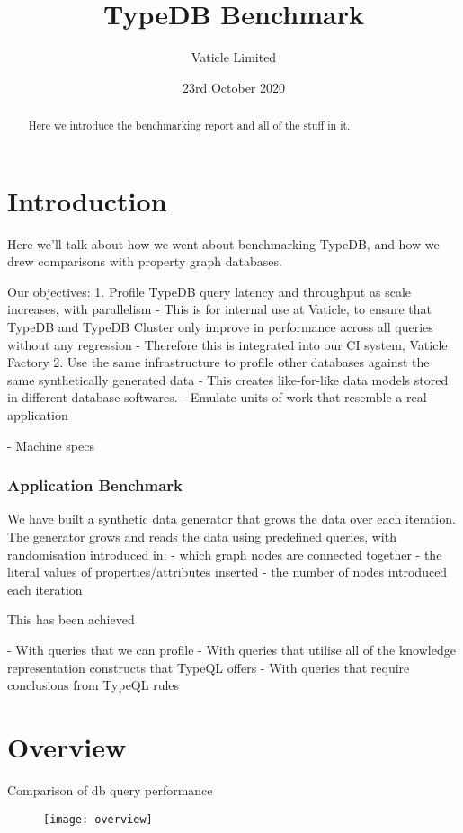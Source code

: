 \documentclass{article}
\begin{document}
\title{TypeDB Benchmark}
\date{23rd October 2020}
\author{Vaticle Limited}

\maketitle

\begin{abstract}
Here we introduce the benchmarking report and all of the stuff in it.
\end{abstract}

\section{Introduction}
Here we'll talk about how we went about benchmarking TypeDB, and how we drew comparisons with property graph databases.

Our objectives:
1. Profile TypeDB query latency and throughput as scale increases, with parallelism
    - This is for internal use at Vaticle, to ensure that TypeDB and TypeDB Cluster only improve in performance across all queries without any regression
    - Therefore this is integrated into our CI system, Vaticle Factory
2. Use the same infrastructure to profile other databases against the same synthetically generated data
    - This creates like-for-like data models stored in different database softwares.
    - Emulate units of work that resemble a real application

- Machine specs

\subsubsection{Application Benchmark}

We have built a synthetic data generator that grows the data over each iteration. The generator grows and reads the data using predefined queries, with randomisation introduced in:
- which graph nodes are connected together
- the literal values of properties/attributes inserted
- the number of nodes introduced each iteration

This has been achieved

- With queries that we can profile
- With queries that utilise all of the knowledge representation constructs that TypeQL offers
- With queries that require conclusions from TypeQL rules


\section{Overview}
Comparison of db query performance

\begin{figure}[H]
\centering
\texttt{[image: overview]}
\end{figure}
\end{document}

